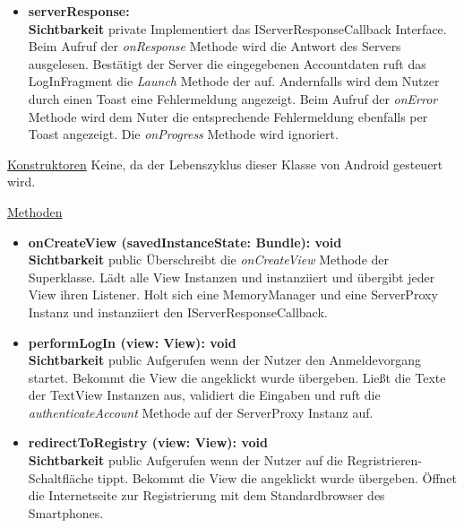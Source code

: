 \begin{itemize}
\item \textbf{serverResponse: } \hfill\\ 
\textbf{Sichtbarkeit} private \newline
Implementiert das IServerResponseCallback Interface. Beim Aufruf der \textit{onResponse} Methode wird die Antwort des Servers ausgelesen. Bestätigt der Server die eingegebenen Accountdaten ruft das LogInFragment die \textit{Launch} Methode der  auf. Andernfalls wird dem Nutzer durch einen Toast eine Fehlermeldung angezeigt. Beim Aufruf der \textit{onError} Methode wird dem Nuter die entsprechende Fehlermeldung ebenfalls per Toast angezeigt. Die \textit{onProgress} Methode wird ignoriert.

\end{itemize}

\underline{Konstruktoren}\newline
\indent Keine, da der Lebenszyklus dieser Klasse von Android gesteuert wird.\newline

\underline{Methoden}
\begin{itemize}
\itemsep0pt
\item \textbf{onCreateView (savedInstanceState: Bundle): void}\hfill\\
\textbf{Sichtbarkeit} public\newline
Überschreibt die \textit{onCreateView} Methode der Superklasse. Lädt alle View Instanzen und instanziiert und übergibt jeder View ihren Listener. Holt sich eine MemoryManager und eine ServerProxy Instanz und instanziiert den IServerResponseCallback.

\item \textbf{performLogIn (view: View): void}\hfill\\
\textbf{Sichtbarkeit} public\newline
Aufgerufen wenn der Nutzer den Anmeldevorgang startet. Bekommt die View die angeklickt wurde übergeben. Ließt die Texte der TextView Instanzen aus, validiert die Eingaben und ruft die \textit{authenticateAccount} Methode auf der ServerProxy Instanz auf. 

\item \textbf{redirectToRegistry (view: View): void}\hfill\\
\textbf{Sichtbarkeit} public\newline
Aufgerufen wenn der Nutzer auf die Regristrieren-Schaltfläche tippt. Bekommt die View die angeklickt wurde übergeben. Öffnet die Internetseite zur Registrierung mit dem Standardbrowser des Smartphones.

\end{itemize}